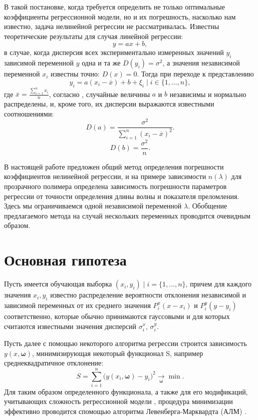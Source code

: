 \documentclass[11pt,a4paper]{article}
\theoremstyle{definition}
\begin{document}
В такой постановке, когда требуется определить не только
оптимальные коэффициенты регрессионной модели, но и их погрешность, насколько нам
известно, задача нелинейной регрессии не рассматривалась. Известны
теоретические результаты для случая линейной регрессии:
\[
  y = ax + b,
\]
в случае, когда дисперсия всех экспериментально измеренных значений $y_i$
зависимой переменной $y$ одна и та же $D(y_i) = \sigma^2$, а значения независимой
переменной $x_i$ известны точно: $D(x) = 0$. Тогда при переходе к представлению
\[
  y_i = a(x_i - \overline{x}) + b + \xi_i \mid i \in \{ 1, \dots, n \},
\]
где $\overline{x} = \frac{\sum_{i = 1}^n x_i}{n}$, согласно \cite{Vatunin05}, случайные величины $a$ и $b$ независимы
и нормально распределены, и, кроме того, их дисперсии выражаются известными соотношениями:
\begin{equation}
  \label{eq:classic_da}
  D(a) = \frac{\sigma^2}{\sum_{i = 1}^n (x_i - \overline{x})^2}.
\end{equation}
\begin{equation}
  \label{eq:classic_db}
  D(b) = \frac{\sigma^2}{n}.
\end{equation}

В настоящей работе предложен общий метод определения
погрешности коэффициентов нелинейной регрессии, и на примере зависимости
$n(\lambda)$ для прозрачного полимера определена зависимость погрешности
параметров регрессии от точности определения длины волны и показателя
преломления. Здесь мы ограничиваемся одной
независимой переменной $\lambda$. Обобщение предлагаемого метода на случай
нескольких переменных проводится очевидным образом.

\section{Основная гипотеза}

Пусть имеется обучающая выборка $(x_i, y_i) \mid i = \{ 1, \dots, n \}$,
причем для каждого значения $x_i, y_i$ известно распределение вероятности отклонения
независимой и зависимой переменных от их среднего значения $P_i^x(x - x_i)$ и
$P_i^y (y - y_i)$ соответственно, которые обычно принимаются гауссовыми и для которых
считаются известными значения дисперсий $\sigma_i^x$, $\sigma_i^y$.

Пусть далее с помощью некоторого алгоритма регрессии строится
зависимость $y(x, \boldsymbol{\omega})$, минимизирующая некоторый функционал S,
например среднеквадратичное отклонение:
\begin{equation}
  S = \sum_{i=1}^n \big(y (x_i, \boldsymbol{\omega}) - y_i\big)^2 \underset{\boldsymbol{\omega}}{\rightarrow} \min.
  \label{eq:S}
\end{equation}
Для таким образом определенного функционала, а также для его модификаций,
учитывающих сложность регрессионной модели \cite{Rudoy13}, процедура минимизации эффективно
проводится спомощью алгоритма Левенберга-Марквардта (АЛМ) \cite{Marquardt1963Algorithm,more:78}.
\end{document}
